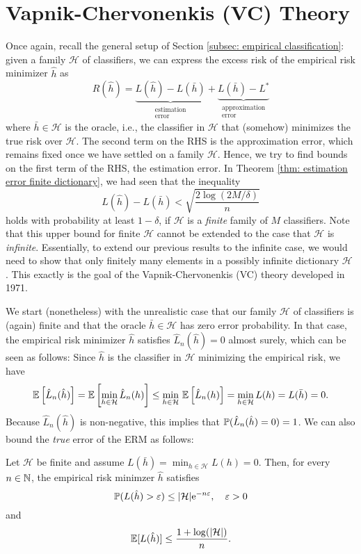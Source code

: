 \chapter{Vapnik-Chervonenkis (VC) Theory}
\label{ch: VC theory}

Once again, recall the general setup of Section \ref{subsec: empirical classification}: given a family $\mathcal{H}$ of classifiers, we can express the excess risk of the empirical risk minimizer $\hat h$ as
\[
    R(\hat h) = \underbrace{L(\hat h) - L(\bar h)}_{\substack{\text{estimation} \\ \text{error}}} + \underbrace{L(\bar h) - L^*}_{\substack{\text{approximation} \\ \text{error}}}
\]
where $\bar h \in \mathcal{H}$ is the oracle, i.e., the classifier in $\mathcal{H}$ that (somehow) minimizes the true risk over $\mathcal{H}$. The second term on the RHS is the approximation error, which remains fixed once we have settled on a family $\mathcal{H}$. Hence, we try to find bounds on the first term of the RHS, the estimation error. In Theorem \ref{thm: estimation error finite dictionary}, we had seen that the inequality
\[
    L(\hat h) - L(\bar h) < \sqrt{\frac{2 \log(2M / \delta)}{n}}
\]
holds with probability at least $1 - \delta$, if $\mathcal{H}$ is a \emph{finite} family of $M$ classifiers. Note that this upper bound for finite $\mathcal{H}$ cannot be extended to the case that $\mathcal{H}$ is \emph{infinite}. Essentially, to extend our previous results to the infinite case, we would need to show that only finitely many elements in a possibly infinite dictionary $\mathcal{H}$ . This exactly is the goal of the Vapnik-Chervonenkis (VC) theory developed in 1971.

We start (nonetheless) with the unrealistic case that our family $\mathcal{H}$ of classifiers is (again) finite and that the oracle $\bar h \in \mathcal{H}$ has zero error probability. In that case, the empirical risk minimizer $\hat h$ satisfies $\hat L_n(\hat h) = 0$ almost surely, which can be seen as follows: Since $\hat h$ is the classifier in $\mathcal{H}$ minimizing the empirical risk, we have
\[
    \Ex{\hat L_n(\hat h)} = \Ex{\min_{h \in \mathcal{H}} \hat L_n(h)} \leq \min_{h \in \mathcal{H}} \, \Ex{\hat L_n(h)} = \min_{h \in \mathcal{H}} L(h) = L(\bar h) = 0.
\]
Because $\hat L_n(\hat h)$ is non-negative, this implies that $\P(\hat L_n(\hat h) = 0) = 1$. We can also bound the \emph{true} error of the ERM as follows:

\begin{theorem}
Let $\mathcal{H}$ be finite and assume $L(\bar h) = \min_{h \in \mathcal{H}} L(h) = 0$. Then, for every $n \in \N$, the empirical risk minimzer $\hat h$ satisfies
\[
    \P(L(\hat h) > \varepsilon) \leq \abs{\mathcal{H}} \e^{-n \varepsilon}, \quad \varepsilon > 0
\]
and
\[
    \ex{L(\hat h)} \leq \frac{1 + \log(\abs{\mathcal{H}})}{n}.
\]
\end{theorem}

